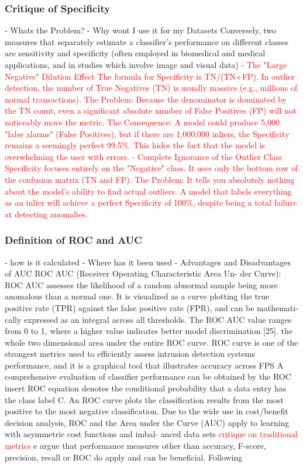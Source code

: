 \subsubsection{Critique of Specificity}
    - Whats the Problem?
    - Why wont I use it for my Datasets
Conversely, two measures that separately estimate a classifier’s performance on different classes are sensitivity and specificity (often employed in biomedical and medical
applications, and in studies which involve image and visual data)
\textcolor{red}{
    -   The "Large Negative" Dilution Effect
    The formula for Specificity is TN/(TN+FP). In outlier detection, the number of True Negatives (TN) is usually massive (e.g., millions of normal transactions).
    The Problem: Because the denominator is dominated by the TN count, even a significant absolute number of False Positives (FP) will not noticeably move the metric.
    The Consequence: A model could produce 5,000 "false alarms" (False Positives), but if there are 1,000,000 inliers, the Specificity remains a seemingly perfect 99.5\%. 
    This hides the fact that the model is overwhelming the user with errors. \citep{saito2015precision}
    -   Complete Ignorance of the Outlier Class
    Specificity focuses entirely on the "Negative" class. It uses only the bottom row of the confusion matrix (TN and FP).
    The Problem: It tells you absolutely nothing about the model's ability to find actual outliers. 
    A model that labels everything as an inlier will achieve a perfect Specificity of 100\%, despite being a total failure at detecting anomalies.
}


\subsubsection{Definition of ROC and AUC}
    - how is it calculated
    - Where has it been used
    - Advantages and Disadvantages of AUC
ROC AUC (Receiver Operating Characteristic Area Un-
der Curve): ROC AUC assesses the likelihood of a random
abnormal sample being more anomalous than a normal one. It
is visualized as a curve plotting the true positive rate (TPR)
against the false positive rate (FPR), and can be mathemati-
cally expressed as an integral across all thresholds. The ROC
AUC value ranges from 0 to 1, where a higher value indicates
better model discrimination [25].
the whole two dimensional area under the entire ROC curve.
ROC curve is one of the strongest metrics used to efficiently
assess intrusion detection systems performance, and it is a
graphical tool that illustrates accuracy across FPS \citep[postfix]{nassif2021}
A comprehensive evaluation of classifier performance can be obtained by the ROC 
insert ROC equation 
denotes the conditional probability that a data entry has the class label C. An
ROC curve plots the classification results from the most positive to the most negative
classification. Due to the wide use in cost/benefit decision analysis, ROC and the Area
under the Curve (AUC) apply to learning with asymmetric cost functions and imbal-
anced data sets
\textcolor{red}{critique on traditional metrics}
e argue that performance measures other than accuracy, F-score, precision, recall or
ROC do apply and can be beneficial. 
Following \citep[p.1017]{sokolova2006beyond}


